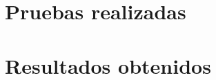 \documentclass[paper=a4, fontsize=11pt]{scrartcl} %
\begin{document}
\section{Pruebas realizadas}




\section{Resultados obtenidos}





\end{document}
